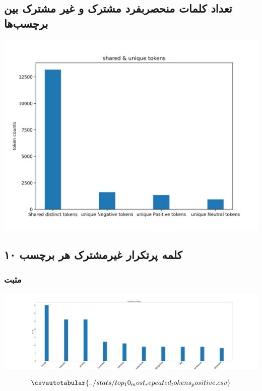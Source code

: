 {	\subsection{تعداد کلمات منحصربفرد مشترک و غیر مشترک بین برچسب‌ها}
	{
		\selectfont \setLR
		\begin{center}
			\includegraphics[scale=0.75]{../stats/shared_&_unique_distinct_tokens_for_each_label.png}
		\end{center}
		\begin{adjustbox}{width=\textwidth}
		\end{adjustbox}
	}
	\newpage
	\subsection{۱۰ کلمه پرتکرار غیرمشترک هر برچسب}
	{ \selectfont
		\subsubsection{\Large مثبت}
		{ \setLR
			\begin{center}
				\includegraphics[scale=0.06]{../stats/top_10_most_repeated_tokens_positive.png}
			\end{center}
			\begin{align*}
				\csvautotabular{../stats/top_10_most_repeated_tokens_positive.csv}  
			\end{align*}
		}
		\newpage
}}
